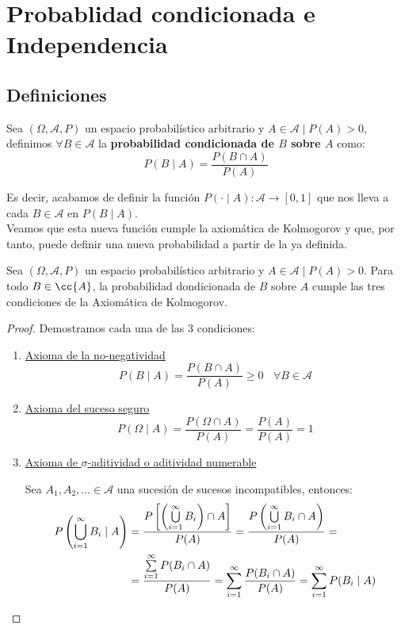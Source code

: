 \chapter{Probablidad condicionada e Independencia}
\section{Definiciones}
\begin{definicion}
    Sea $(\Omega, \mathcal{A}, P)$ un espacio probabilístico arbitrario y $A \in \mathcal{A} \mid P(A)>0$, definimos $\forall B \in \mathcal{A}$ la \textbf{probabilidad condicionada de $B$ sobre $A$} como:
    $$P(B\mid A) = \dfrac{P(B \cap A)}{P(A)}$$
\end{definicion}

Es decir, acabamos de definir la función $P(\cdot \mid A):\mathcal{A} \rightarrow [0,1]$
que nos lleva a cada $B \in \mathcal{A}$ en $P(B\mid A)$.\\


Veamos que esta nueva función cumple la axiomática de Kolmogorov y que, por tanto,
puede definir una nueva probabilidad a partir de la ya definida.
\begin{prop}
    Sea $(\Omega, \mathcal{A}, P)$ un espacio probabilístico arbitrario y $A \in \mathcal{A} \mid P(A)>0$. Para todo $B\in \cc{A}$, la probabilidad dondicionada de $B$ sobre $A$ cumple las tres condiciones de la Axiomática de Kolmogorov.
\end{prop}
\begin{proof}
    Demostramos cada una de las 3 condiciones:
    \begin{enumerate}
        \item \underline{Axioma de la no-negatividad}
        $$P(B\mid A) = \dfrac{P(B \cap A)}{P(A)} \geq 0 ~~~~\forall B \in \mathcal{A}$$
        
        \item \underline{Axioma del suceso seguro}
        $$P(\Omega \mid A) = \dfrac{P(\Omega \cap A)}{P(A)} = \dfrac{P(A)}{P(A)} = 1$$
        
        \item \underline{Axioma de $\sigma$-aditividad o aditividad numerable}

        Sea $A_1, A_2, \ldots \in \mathcal{A}$ una sucesión de sucesos incompatibles, entonces:
        \begin{equation*}\begin{split}
            P\left(\bigcup_{i=1}^\infty B_i \mid A\right)&
            = \dfrac{P\left[ \left(\bigcup\limits_{i=1}^\infty B_i\right) \cap A \right]}{P(A)}
            = \dfrac{P\left(\bigcup\limits_{i=1}^\infty B_i \cap A \right)}{P(A)}
            = \\&
            = \dfrac{\sum\limits_{i=1}^\infty P(B_i \cap A)}{P(A)}
            = \sum_{i=1}^\infty \dfrac{P(B_i \cap A)}{P(A)}
            = \sum_{i=1}^\infty P(B_i \mid A) \qedhere
        \end{split}\end{equation*}
    \end{enumerate}
\end{proof}

